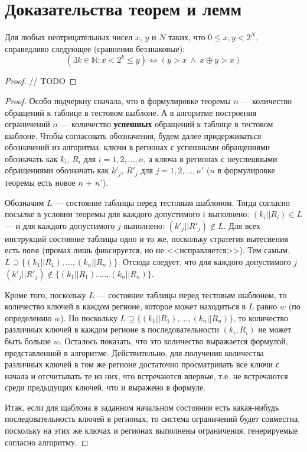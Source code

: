 \chapter{Доказательства теорем и лемм}\label{sec:proofs}

\begin{lemma}\label{QuantorElimination}
Для любых неотрицательных чисел $x$, $y$ и $N$ таких, что $0 \leqslant x, y < 2^N$, справедливо следующее (сравнения беззнаковые):
$$( \exists k \in \mathds{N} : x < 2^k \leqslant y ) \Leftrightarrow (y > x ~\wedge~ x \oplus y > x)$$
\end{lemma}
\begin{proof}
  // TODO
\end{proof}

\theoremtext{\ref{mirror_fullness_none}}{\FullnessMirrorNone}
\begin{proof}
  Особо подчеркну сначала, что в формулировке теоремы $n$ --- количество обращений к таблице в тестовом шаблоне. А в алгоритме построения ограничений $n$ --- количество \textbf{успешных} обращений к таблице в тестовом шаблоне. Чтобы согласовать обозначения, будем далее придерживаться обозначений из алгоритма: ключи в регионах с успешными обращениями обозначать как $k_i$, $R_i$ для $i = 1, 2, ..., n$, а ключа в регионах с неуспешными обращениями обозначать как $k'_j$, $R'_j$ для $j = 1, 2, ..., n'$ ($n$ в формулировке теоремы есть новое $n$ + $n'$).

  Обозначим $L$ --- состояние таблицы перед тестовым шаблоном. Тогда согласно посылке в условии теоремы для каждого допустимого $i$ выполнено: $(k_i || R_i) \in L$ --- и для каждого допустимого $j$ выполнено: $(k'_j || R'_j) \notin L$. Для всех инструкций состояние таблицы одно и то же, поскольку стратегия вытеснения есть \texttt{none} (промах лишь фиксируется, но не <<исправляется>>). Тем самым. $L \supseteq \{ (k_1||R_1), ..., (k_n||R_n) \}$. Отсюда следует, что для каждого допустимого $j$ $(k'_j||R'_j) \notin \{ (k_1||R_1), ..., (k_n||R_n) \}$.

  Кроме того, поскольку $L$ --- состояние таблицы перед тестовым шаблоном, то количество ключей в каждом регионе, которое может находиться в $L$ равно $w$ (по определению $w$). Но поскольку $L \supseteq \{ (k_1||R_1), ..., (k_n||R_n) \}$, то количество различных ключей в каждом регионе в последовательности $(k_i, R_i)$ не может быть больше $w$. Осталось показать, что это количество выражается формулой, представленной в алгоритме. Действительно, для получения количества различных ключей в том же регионе достаточно просматривать все ключи с начала и отсчитывать те из них, что встречаются впервые, т.е. не встречаются среди предыдущих ключей, что и выражено в формуле.

  Итак, если для щаблона в заданном начальном состоянии есть какая-нибудь последовательность ключей в регионах, то система ограничений будет совместна, поскольку на этих же ключах и регионах выполнены ограничения, генерируемые согласно алгоритму.
\end{proof}

